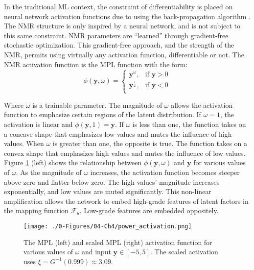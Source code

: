 In the traditional \gls{ML} context, the constraint of differentiability is placed on neural network activation functions due to using the back-propagation algorithm \citep{rojas1996backpropagation}. The \gls{NMR} structure is only inspired by a neural network, and is not subject to this same constraint. \Gls{NMR} parameters are ``learned'' through gradient-free stochastic optimization. This gradient-free approach, and the strength of the \gls{NMR}, permits using virtually any activation function, differentiable or not. The \gls{NMR} activation function is the \gls{MPL} function with the form:
\begin{equation}
    \phi \left( \mathbf{y}, \omega \right) =
    \begin{cases}
        \mathbf{y}^{\omega},           & \text{if $\mathbf{y} > 0$} \\
        \mathbf{y}^{\frac{1}{\omega}}, & \text{if $\mathbf{y} < 0$} \\
    \end{cases}
    \label{eq:power}
\end{equation}


Where $\omega$ is a trainable parameter. The magnitude of $\omega$ allows the activation function to emphasize certain regions of the latent distribution. If $\omega = 1$, the activation is linear and $\phi \left( \mathbf{y}, 1 \right)=\mathbf{y}$. If $\omega$ is less than one, the function takes on a concave shape that emphasizes low values and mutes the influence of high values. When $\omega$ is greater than one, the opposite is true. The function takes on a convex shape that emphasizes high values and mutes the influence of low values. Figure \ref{fig:power_activation} (left) shows the relationship between $\phi \left( \mathbf{y}, \omega \right)$ and $\mathbf{y}$ for various values of $\omega$. As the magnitude of $\omega$ increases, the activation function becomes steeper above zero and flatter below zero. The high values' magnitude increases exponentially, and low values are muted significantly. This non-linear amplification allows the network to embed high-grade features of latent factors in the mapping function $\mathcal{F}_{\theta}$. Low-grade features are embedded oppositely.

\begin{figure}[htb!]
    \centering
    \texttt{[image: ./0-Figures/04-Ch4/power\_activation.png]}
    \caption{The \gls{MPL} (left) and scaled \gls{MPL} (right) activation function for various values of $\omega$ and input $\mathbf{y} \in [-5,5]$. The scaled activation uses $\xi = G^{-1}(0.999) \approx 3.09$. }
    \label{fig:power_activation}
\end{figure}

